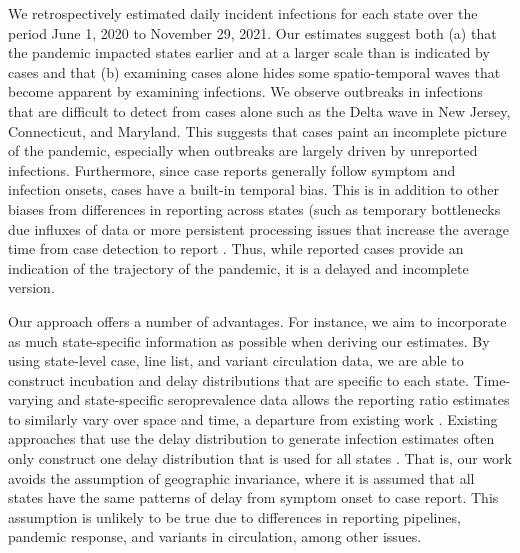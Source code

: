 \documentclass{article}
\begin{document}
We retrospectively estimated daily incident infections for each \US state over
the period June 1, 2020 to November 29, 2021. Our estimates suggest both (a)
that the pandemic impacted states earlier and at a larger scale than is
indicated by cases and that (b) examining cases alone hides some spatio-temporal
waves that become apparent by examining infections. We observe outbreaks in
infections that are difficult to detect from cases alone such as the Delta wave
in New Jersey, Connecticut, and Maryland. This suggests that cases paint an
incomplete picture of the pandemic, especially when outbreaks are largely driven
by unreported infections. Furthermore, since case reports generally follow
symptom and infection onsets, cases have a built-in temporal bias. This is in addition
to other biases from differences in reporting across states (such as temporary
bottlenecks due influxes of data or more persistent processing issues that
increase the average time from case detection to report \citep{wash2020dash,
dunkel2020covid19}. 
Thus, while reported cases provide an indication of the trajectory of the
pandemic, it is a delayed and incomplete version.


Our approach offers a number of advantages.
For instance, we aim to incorporate as much state-specific information as
possible when deriving our estimates. By using state-level case, line list, and
variant circulation data, we are able to construct incubation and delay
distributions that are specific to each state. Time-varying and state-specific
seroprevalence data allows the reporting ratio estimates to similarly vary over
space and time, a departure from existing work \citep{unwin2020state,
uga2020covid19}. Existing approaches that use the delay distribution to generate
infection estimates often only construct one delay distribution that is used for
all states \citep{chitwood2022reconstructing, jahja2022real}. That is, our work
avoids the assumption of geographic invariance, where it is assumed that
all states have the same patterns of delay from symptom onset to case report.
This assumption is
unlikely to be true due to differences in reporting pipelines, pandemic
response, and variants in circulation, among other issues. 
\end{document}
